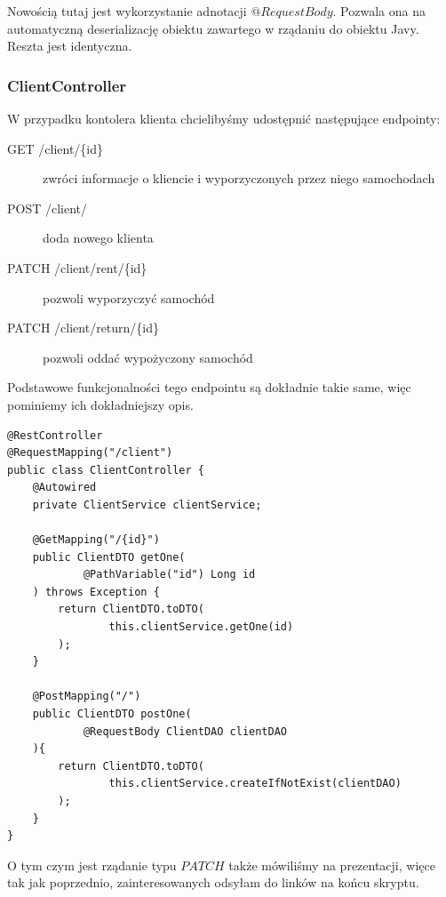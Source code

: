 \documentclass{article}
\begin{document}
                Nowością tutaj jest wykorzystanie adnotacji $@RequestBody$. Pozwala ona na automatyczną deserializację obiektu zawartego w rządaniu do obiektu Javy. Reszta jest identyczna.
            \subsubsection{ClientController}
                W przypadku kontolera klienta chcielibyśmy udostępnić następujące endpointy:
                \begin{description}
                    \item[GET /client/\{id\}] zwróci informacje o kliencie i wyporzyczonych przez niego samochodach
                    \item[POST /client/] doda nowego klienta
                    \item[PATCH /client/rent/\{id\}] pozwoli wyporzyczyć samochód
                    \item[PATCH /client/return/\{id\}] pozwoli oddać wypożyczony samochód
                \end{description}
                
                Podstawowe funkcjonalności tego endpointu są dokładnie takie same, więc pominiemy ich dokładniejszy opis.
                \begin{verbatim}
@RestController
@RequestMapping("/client")
public class ClientController {
    @Autowired
    private ClientService clientService;

    @GetMapping("/{id}")
    public ClientDTO getOne(
            @PathVariable("id") Long id
    ) throws Exception {
        return ClientDTO.toDTO(
                this.clientService.getOne(id)
        );
    }

    @PostMapping("/")
    public ClientDTO postOne(
            @RequestBody ClientDAO clientDAO
    ){
        return ClientDTO.toDTO(
                this.clientService.createIfNotExist(clientDAO)
        );
    }
}
                \end{verbatim}
                
                O tym czym jest rządanie typu $PATCH$ także mówiliśmy na prezentacji, więce tak jak poprzednio, zainteresowanych odsyłam do linków na końcu skryptu.
                
\end{document}
